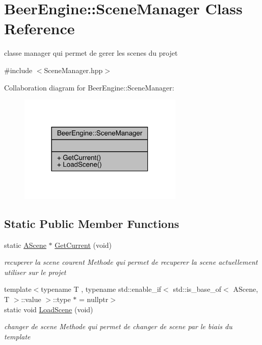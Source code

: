 \hypertarget{class_beer_engine_1_1_scene_manager}{}\section{Beer\+Engine\+:\+:Scene\+Manager Class Reference}
\label{class_beer_engine_1_1_scene_manager}


classe manager qui permet de gerer les scenes du projet  




{\ttfamily \#include $<$Scene\+Manager.\+hpp$>$}



Collaboration diagram for Beer\+Engine\+:\+:Scene\+Manager\+:\nopagebreak
\begin{figure}[H]
\begin{center}
\leavevmode
\includegraphics[width=222pt]{class_beer_engine_1_1_scene_manager__coll__graph}
\end{center}
\end{figure}
\subsection*{Static Public Member Functions}
\begin{DoxyCompactItemize}
\item 
static \mbox{\hyperlink{class_beer_engine_1_1_a_scene}{A\+Scene}} $\ast$ \mbox{\hyperlink{class_beer_engine_1_1_scene_manager_abf2128f0d4f9e0c77900bddc65237a18}{Get\+Current}} (void)
\begin{DoxyCompactList}\small\item\em recuperer la scene courent Methode qui permet de recuperer la scene actuellement utiliser sur le projet \end{DoxyCompactList}\item 
{\footnotesize template$<$typename T , typename std\+::enable\+\_\+if$<$ std\+::is\+\_\+base\+\_\+of$<$ A\+Scene, T $>$\+::value $>$\+::type $\ast$  = nullptr$>$ }\\static void \mbox{\hyperlink{class_beer_engine_1_1_scene_manager_a9414ed3c9d4a170e198afe83d15db360}{Load\+Scene}} (void)
\begin{DoxyCompactList}\small\item\em changer de scene Methode qui permet de changer de scene par le biais du template \end{DoxyCompactList}\end{DoxyCompactItemize}



